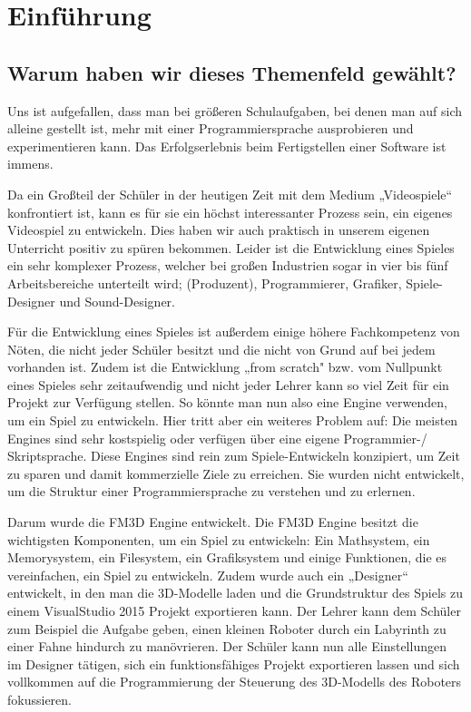 
\chapter{Einführung}
\label{c:einführung}
\setcounter{page}{1}
\section[Warum dieses Themenfeld?]{Warum haben wir dieses Themenfeld gewählt?}

Uns ist aufgefallen, dass man bei größeren Schulaufgaben, bei denen man auf sich alleine gestellt ist, mehr mit einer Programmiersprache ausprobieren und experimentieren kann. Das Erfolgserlebnis beim Fertigstellen einer Software ist immens. 

Da ein Großteil der Schüler in der heutigen Zeit mit dem Medium „Videospiele“ konfrontiert ist, kann es für sie ein höchst interessanter Prozess sein, ein eigenes Videospiel zu entwickeln. Dies haben wir auch praktisch in unserem eigenen Unterricht positiv zu spüren bekommen.
Leider ist die Entwicklung eines Spieles ein sehr komplexer Prozess, welcher bei großen Industrien sogar in vier bis fünf Arbeitsbereiche unterteilt wird; (Produzent), Programmierer, Grafiker, Spiele-Designer und Sound-Designer.  \cite{gea}

Für die Entwicklung eines Spieles ist außerdem einige höhere Fachkompetenz von Nöten, die nicht jeder Schüler besitzt und die nicht von Grund auf bei jedem vorhanden ist. Zudem ist die Entwicklung „from scratch"  bzw. vom Nullpunkt eines Spieles sehr zeitaufwendig und nicht jeder Lehrer kann so viel Zeit für ein Projekt zur Verfügung stellen. 
So könnte man nun also eine Engine verwenden, um ein Spiel zu entwickeln. Hier tritt aber ein weiteres Problem auf: Die meisten Engines sind sehr kostspielig oder verfügen über eine eigene Programmier-/ Skriptsprache. Diese Engines sind rein zum Spiele-Entwickeln konzipiert, um Zeit zu sparen und damit kommerzielle Ziele zu erreichen. Sie wurden nicht entwickelt, um die Struktur einer Programmiersprache zu verstehen und zu erlernen.

Darum wurde die \ac{FM3D} Engine entwickelt. Die FM3D Engine besitzt die wichtigsten Komponenten, um ein Spiel zu entwickeln: Ein Mathsystem, ein Memorysystem, ein Filesystem, ein Grafiksystem und einige Funktionen, die es vereinfachen, ein Spiel zu entwickeln.
Zudem wurde auch ein „Designer“ entwickelt, in den man die 3D-Modelle laden und die Grundstruktur des Spiels zu einem VisualStudio 2015 Projekt exportieren kann.
Der Lehrer kann dem Schüler zum Beispiel die Aufgabe geben, einen kleinen Roboter durch ein Labyrinth zu einer Fahne hindurch zu manövrieren. Der Schüler kann nun alle Einstellungen im Designer tätigen, sich ein funktionsfähiges Projekt exportieren lassen und sich vollkommen auf die Programmierung der Steuerung des 3D-Modells des Roboters fokussieren.

